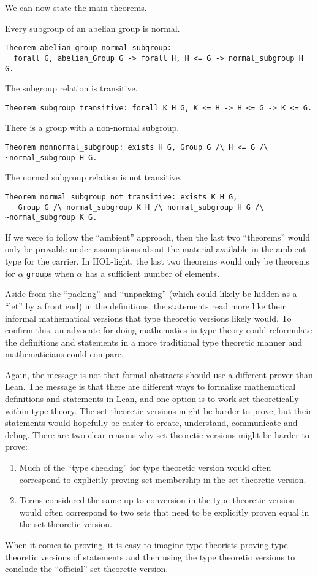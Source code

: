 \documentclass{article}
\begin{document}
We can now state the main theorems.

Every subgroup of an abelian group is normal.
\begin{verbatim}
Theorem abelian_group_normal_subgroup:
  forall G, abelian_Group G -> forall H, H <= G -> normal_subgroup H G.
\end{verbatim}

The subgroup relation is transitive.
\begin{verbatim}
Theorem subgroup_transitive: forall K H G, K <= H -> H <= G -> K <= G.
\end{verbatim}

There is a group with a non-normal subgroup.
\begin{verbatim}
Theorem nonnormal_subgroup: exists H G, Group G /\ H <= G /\ ~normal_subgroup H G.
\end{verbatim}

The normal subgroup relation is not transitive.
\begin{verbatim}
Theorem normal_subgroup_not_transitive: exists K H G,
   Group G /\ normal_subgroup K H /\ normal_subgroup H G /\ ~normal_subgroup K G.
\end{verbatim}

If we were to follow the ``ambient'' approach, then the last two ``theorems'' would only
be provable under assumptions about the material available in the ambient type for the carrier.
In HOL-light, the last two theorems would only be theorems for $\alpha$ {\tt{group}}s
when $\alpha$ has a sufficient number of elements.

Aside from the ``packing'' and ``unpacking'' (which could likely be hidden as a ``let'' by a front end)
in the definitions, the statements read more like their informal mathematical versions
that type theoretic versions likely would. To confirm this, an advocate for doing
mathematics in type theory could reformulate the definitions and statements
in a more traditional type theoretic manner
and mathematicians could compare.

Again, the message is not that formal abstracts should use a different prover than Lean.
The message is that there are different ways to formalize mathematical definitions and statements
in Lean, and one option is to work set theoretically within type theory.
The set theoretic versions might be harder to prove, but their statements would hopefully
be easier to create, understand, communicate and debug.
There are two clear reasons why set theoretic versions might be harder to prove:
\begin{enumerate}
\item Much of the ``type checking'' for type theoretic version would often correspond to explicitly proving
  set membership in the set theoretic version.
\item Terms considered the same up to conversion in the type theoretic version would often
  correspond to two sets that need to be explicitly proven equal in the set theoretic version.
\end{enumerate}
When it comes to proving, it is easy to imagine type theorists proving type theoretic versions
of statements and then using the type theoretic versions to conclude the ``official'' set theoretic version.




\end{document}
